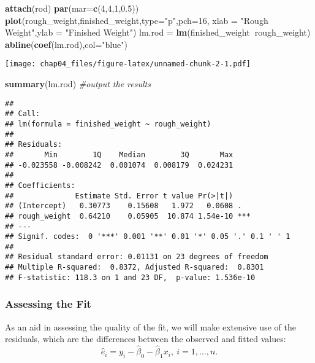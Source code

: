 \documentclass[]{article}
\newenvironment{Shaded}{\begin{snugshade}}{\end{snugshade}}
\newcommand{\CommentTok}[1]{\textcolor[rgb]{0.56,0.35,0.01}{\textit{#1}}}
\newcommand{\DataTypeTok}[1]{\textcolor[rgb]{0.13,0.29,0.53}{#1}}
\newcommand{\DecValTok}[1]{\textcolor[rgb]{0.00,0.00,0.81}{#1}}
\newcommand{\FloatTok}[1]{\textcolor[rgb]{0.00,0.00,0.81}{#1}}
\newcommand{\KeywordTok}[1]{\textcolor[rgb]{0.13,0.29,0.53}{\textbf{#1}}}
\newcommand{\NormalTok}[1]{#1}
\newcommand{\OperatorTok}[1]{\textcolor[rgb]{0.81,0.36,0.00}{\textbf{#1}}}
\newcommand{\StringTok}[1]{\textcolor[rgb]{0.31,0.60,0.02}{#1}}
\begin{document}
\begin{Shaded}
\begin{Highlighting}[]
\KeywordTok{attach}\NormalTok{(rod)}
\KeywordTok{par}\NormalTok{(}\DataTypeTok{mar=}\KeywordTok{c}\NormalTok{(}\DecValTok{4}\NormalTok{,}\DecValTok{4}\NormalTok{,}\DecValTok{1}\NormalTok{,}\FloatTok{0.5}\NormalTok{))}
\KeywordTok{plot}\NormalTok{(rough_weight,finished_weight,}\DataTypeTok{type=}\StringTok{"p"}\NormalTok{,}\DataTypeTok{pch=}\DecValTok{16}\NormalTok{,}
     \DataTypeTok{xlab =} \StringTok{"Rough Weight"}\NormalTok{,}\DataTypeTok{ylab =} \StringTok{"Finished Weight"}\NormalTok{)}
\NormalTok{lm.rod =}\StringTok{ }\KeywordTok{lm}\NormalTok{(finished_weight}\OperatorTok{~}\NormalTok{rough_weight)}
\KeywordTok{abline}\NormalTok{(}\KeywordTok{coef}\NormalTok{(lm.rod),}\DataTypeTok{col=}\StringTok{"blue"}\NormalTok{)}
\end{Highlighting}
\end{Shaded}

\texttt{[image: chap04\_files/figure-latex/unnamed-chunk-2-1.pdf]}

\begin{Shaded}
\begin{Highlighting}[]
\KeywordTok{summary}\NormalTok{(lm.rod) }\CommentTok{#output the results}
\end{Highlighting}
\end{Shaded}

\begin{verbatim}
## 
## Call:
## lm(formula = finished_weight ~ rough_weight)
## 
## Residuals:
##       Min        1Q    Median        3Q       Max 
## -0.023558 -0.008242  0.001074  0.008179  0.024231 
## 
## Coefficients:
##              Estimate Std. Error t value Pr(>|t|)    
## (Intercept)   0.30773    0.15608   1.972   0.0608 .  
## rough_weight  0.64210    0.05905  10.874 1.54e-10 ***
## ---
## Signif. codes:  0 '***' 0.001 '**' 0.01 '*' 0.05 '.' 0.1 ' ' 1
## 
## Residual standard error: 0.01131 on 23 degrees of freedom
## Multiple R-squared:  0.8372, Adjusted R-squared:  0.8301 
## F-statistic: 118.3 on 1 and 23 DF,  p-value: 1.536e-10
\end{verbatim}

\hypertarget{assessing-the-fit}{%
\subsubsection{Assessing the Fit}\label{assessing-the-fit}}

As an aid in assessing the quality of the fit, we will make extensive
use of the residuals, which are the differences between the observed and
fitted values:
\[\hat e_i = y_i-\hat\beta_0-\hat\beta_1x_i,\ i=1,\dots,n.\]
\end{document}
